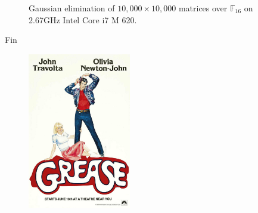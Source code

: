 \documentclass[11pt]{beamer}
\newcommand{\field}[1]{\mathbb{#1}}
\newcommand{\F}{\ensuremath{\field{F}}\xspace}
\begin{document}
\begin{frame}[fragile]
\begin{figure}[htbp]
\begin{center}
\begin{tikzpicture}[xscale=0.035,yscale=0.2]
\end{tikzpicture}
\caption{Gaussian elimination of $10,000 \times 10,000$ matrices over $\F_{16}$ on 2.67GHz Intel Core i7 M 620.}
\label{fig:sparse-m4rie}
\end{center}
\end{figure}


   
\end{frame}


\begin{frame}{Fin}
\begin{figure}[h]
 \centering
 \includegraphics[width=0.4\textwidth]{./grease.jpg}
\end{figure}

\begin{center}

\end{center}

\end{frame}

\begin{frame}[allowframebreaks]


\end{frame}
\end{document}
